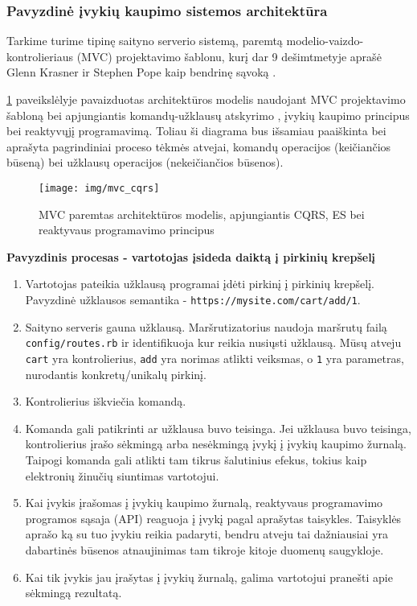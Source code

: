 \subsubsection{Pavyzdinė įvykių kaupimo sistemos architektūra}

Tarkime turime tipinę saityno serverio sistemą, paremtą modelio-vaizdo-kontrolieriaus (MVC) projektavimo šablonu, kurį dar 9 dešimtmetyje aprašė Glenn Krasner ir Stephen Pope kaip bendrinę sąvoką \cite{Krasner:1988:CUM:50757.50759}.

\ref{img:mvc_cqrs} paveikslėlyje pavaizduotas architektūros modelis naudojant MVC projektavimo šabloną bei apjungiantis komandų-užklausų atskyrimo , įvykių kaupimo principus bei reaktyvųjį programavimą. Toliau ši diagrama bus išsamiau paaiškinta bei aprašyta pagrindiniai proceso tėkmės atvejai, komandų operacijos (keičiančios būseną) bei užklausų operacijos (nekeičiančios būsenos).

\begin{figure}[H]
    \centering
    \texttt{[image: img/mvc\_cqrs]}
    \caption{MVC paremtas architektūros modelis, apjungiantis CQRS, ES bei reaktyvaus programavimo principus}
    \label{img:mvc_cqrs}
\end{figure}

\textbf{Pavyzdinis procesas - vartotojas įsideda daiktą į pirkinių krepšelį}

\begin{enumerate}
  \item Vartotojas pateikia užklausą programai įdėti pirkinį į pirkinių krepšelį. Pavyzdinė užklausos semantika - \lstinline|https://mysite.com/cart/add/1|.

  \item Saityno serveris gauna užklausą. Maršrutizatorius naudoja maršrutų failą \lstinline|config/routes.rb| ir identifikuoja kur reikia nusiųsti užklausą. Mūsų atveju \lstinline|cart| yra kontrolierius, \lstinline|add| yra norimas atlikti veiksmas, o \lstinline|1| yra parametras, nurodantis konkretų/unikalų pirkinį.

  \item Kontrolierius iškviečia komandą.

  \item Komanda gali patikrinti ar užklausa buvo teisinga. Jei užklausa buvo teisinga, kontrolierius įrašo sėkmingą arba nesėkmingą įvykį į įvykių kaupimo žurnalą. Taipogi komanda gali atlikti tam tikrus šalutinius efekus, tokius kaip elektronių žinučių siuntimas vartotojui.

  \item Kai įvykis įrašomas į įvykių kaupimo žurnalą, reaktyvaus programavimo programos sąsaja (API) reaguoja į įvykį pagal aprašytas taisykles. Taisyklės aprašo ką su tuo įvykiu reikia padaryti, bendru atveju tai dažniausiai yra dabartinės būsenos atnaujinimas tam tikroje kitoje duomenų saugykloje.

  \item Kai tik įvykis jau įrašytas į įvykių žurnalą, galima vartotojui pranešti apie sėkmingą rezultatą.
\end{enumerate}

